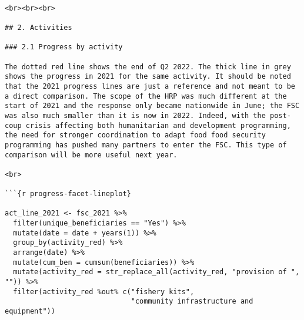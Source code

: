 \documentclass[
]{article}
\begin{document}
\begin{verbatim}

<br><br><br>

## 2. Activities

### 2.1 Progress by activity

The dotted red line shows the end of Q2 2022. The thick line in grey shows the progress in 2021 for the same activity. It should be noted that the 2021 progress lines are just a reference and not meant to be a direct comparison. The scope of the HRP was much different at the start of 2021 and the response only became nationwide in June; the FSC was also much smaller than it is now in 2022. Indeed, with the post-coup crisis affecting both humanitarian and development programming, the need for stronger coordination to adapt food food security programming has pushed many partners to enter the FSC. This type of comparison will be more useful next year. 

<br>

```{r progress-facet-lineplot}

act_line_2021 <- fsc_2021 %>% 
  filter(unique_beneficiaries == "Yes") %>%
  mutate(date = date + years(1)) %>% 
  group_by(activity_red) %>% 
  arrange(date) %>% 
  mutate(cum_ben = cumsum(beneficiaries)) %>% 
  mutate(activity_red = str_replace_all(activity_red, "provision of ", "")) %>% 
  filter(activity_red %out% c("fishery kits", 
                              "community infrastructure and equipment"))


\end{verbatim}
\end{document}
